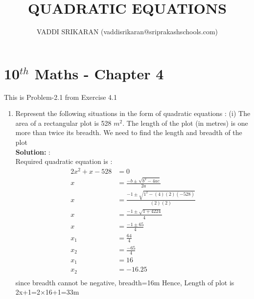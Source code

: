 \documentclass[12pt]{article}
\title{QUADRATIC EQUATIONS}
\author{VADDI SRIKARAN (vaddisrikaran@sriprakashschools.com)}
\newcommand{\solution}{\noindent \textbf{Solution: }}
\begin{document}
    \maketitle
    \section*{10$^{th}$ Maths - Chapter 4}
    This is Problem-2.1 from Exercise 4.1
    \begin{enumerate}
    \item Represent the following situations in the form of quadratic equations :
(i) The area of a rectangular plot is 528 $m^2$. The length of the plot (in metres) is one more than twice its breadth. We need to find the length and breadth of the plot\\
\solution:\\Required quadratic equation is :
\begin{align}
2x^2+x-528 &= 0\\
x&=\frac{-b\pm\sqrt{b^2-4ac}}{2a}\\
x&=\frac{-1\pm\sqrt{1^2-(4)(2)(-528)}}{(2)(2)}\\
x&=\frac{-1\pm\sqrt{1+4224}}{4}\\
x&=\frac{-1\pm 65}{4}\\
x_1&=\frac{64}{4}\\
x_2&=\frac{-65}{4}\\
x_1&=16\\
x_2&=-16.25\\
\end{align}
since breadth cannot be negative, breadth=16m
Hence, Length of plot is {2x+1=2×16+1=33m}\\
\end{enumerate}
\end{document}
